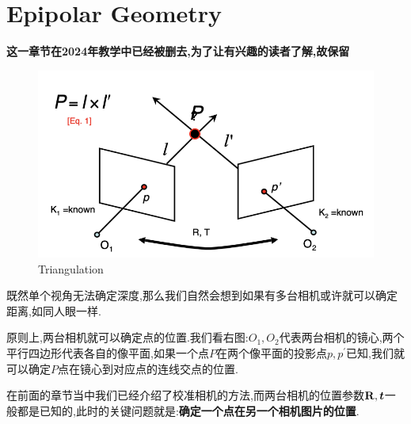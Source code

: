 \chapter{Epipolar Geometry}

\textbf{这一章节在2024年教学中已经被删去,为了让有兴趣的读者了解,故保留}

\begin{figure}
	\includegraphics[scale=0.3]{figures/triangulation.png}
	\caption{Triangulation}
\end{figure}

既然单个视角无法确定深度,那么我们自然会想到如果有多台相机或许就可以确定距离,如同人眼一样.

原则上,两台相机就可以确定点的位置.我们看右图:$O_1, O_2$代表两台相机的镜心,两个平行四边形代表各自的像平面,如果一个点$P$在两个像平面的投影点$p, p^\prime$已知,我们就可以确定$P$点在镜心到对应点的连线交点的位置.

在前面的章节当中我们已经介绍了校准相机的方法,而两台相机的位置参数$\bold{R}, \bm t$一般都是已知的,此时的关键问题就是:\textbf{确定一个点在另一个相机图片的位置}.



